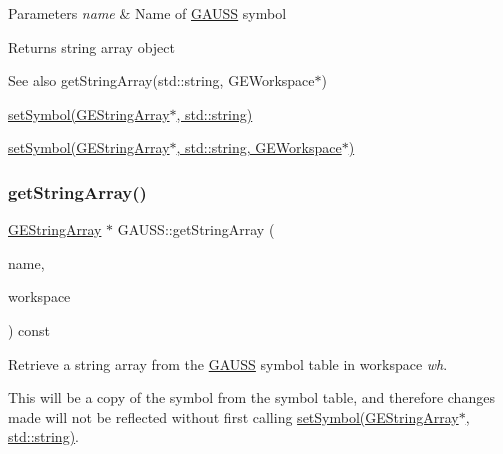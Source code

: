 \begin{DoxyParams}{Parameters}
{\em name} & Name of \hyperlink{class_g_a_u_s_s}{G\+A\+U\+SS} symbol \\
\hline
\end{DoxyParams}
\begin{DoxyReturn}{Returns}
string array object
\end{DoxyReturn}
\begin{DoxySeeAlso}{See also}
get\+String\+Array(std\+::string, G\+E\+Workspace$\ast$) 

\hyperlink{class_g_a_u_s_s_ac73f4a999e796eccb2728f1f914baff6}{set\+Symbol(\+G\+E\+String\+Array$\ast$, std\+::string)} 

\hyperlink{class_g_a_u_s_s_a608f4d41dbb4dd9fe839732bf5412043}{set\+Symbol(\+G\+E\+String\+Array$\ast$, std\+::string, G\+E\+Workspace$\ast$)} 
\end{DoxySeeAlso}
\mbox{\label{class_g_a_u_s_s_aa99bda725394312004da96876501a366}} 
\subsubsection{\texorpdfstring{get\+String\+Array()}{getStringArray()}\hspace{0.1cm}{\footnotesize\ttfamily [2/2]}}
{\footnotesize\ttfamily \hyperlink{class_g_e_string_array}{G\+E\+String\+Array} $\ast$ G\+A\+U\+S\+S\+::get\+String\+Array (\begin{DoxyParamCaption}\item[{std\+::string}]{name,  }\item[{\hyperlink{class_g_e_workspace}{G\+E\+Workspace} $\ast$}]{workspace }\end{DoxyParamCaption}) const}



Retrieve a string array from the \hyperlink{class_g_a_u_s_s}{G\+A\+U\+SS} symbol table in workspace {\itshape wh}. 

This will be a copy of the symbol from the symbol table, and therefore changes made will not be reflected without first calling \hyperlink{class_g_a_u_s_s_ac73f4a999e796eccb2728f1f914baff6}{set\+Symbol(\+G\+E\+String\+Array$\ast$, std\+::string)}.


